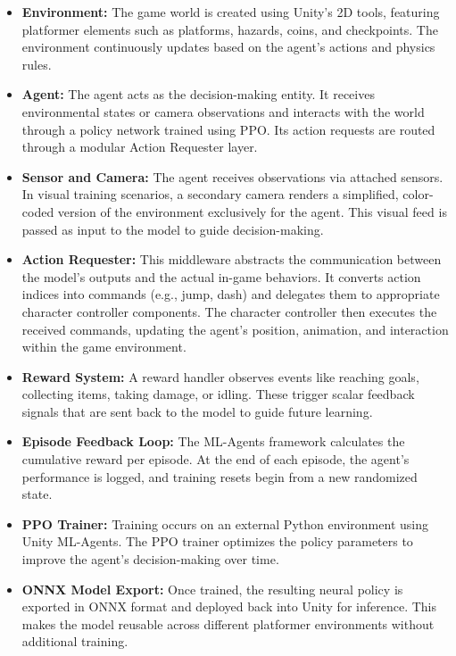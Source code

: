 \documentclass[12pt,oneside,openright,a4paper]{cpe-english-project}
\begin{document}
\begin{itemize}
\item \textbf{Environment:} The game world is created using Unity’s 2D tools, featuring platformer elements such as platforms, hazards, coins, and checkpoints. The environment continuously updates based on the agent’s actions and physics rules.

\item \textbf{Agent:} The agent acts as the decision-making entity. It receives environmental states or camera observations and interacts with the world through a policy network trained using PPO. Its action requests are routed through a modular Action Requester layer.

\item \textbf{Sensor and Camera:} The agent receives observations via attached sensors. In visual training scenarios, a secondary camera renders a simplified, color-coded version of the environment exclusively for the agent. This visual feed is passed as input to the model to guide decision-making.

\item \textbf{Action Requester:} This middleware abstracts the communication between the model’s outputs and the actual in-game behaviors. It converts action indices into commands (e.g., jump, dash) and delegates them to appropriate character controller components. The character controller then executes the received commands, updating the agent's position, animation, and interaction within the game environment.

\item \textbf{Reward System:} A reward handler observes events like reaching goals, collecting items, taking damage, or idling. These trigger scalar feedback signals that are sent back to the model to guide future learning.

\item \textbf{Episode Feedback Loop:} The ML-Agents framework calculates the cumulative reward per episode. At the end of each episode, the agent's performance is logged, and training resets begin from a new randomized state.

\item \textbf{PPO Trainer:} Training occurs on an external Python environment using Unity ML-Agents. The PPO trainer optimizes the policy parameters to improve the agent’s decision-making over time.

\item \textbf{ONNX Model Export:} Once trained, the resulting neural policy is exported in ONNX format and deployed back into Unity for inference. This makes the model reusable across different platformer environments without additional training.
\end{itemize}
\end{document}
